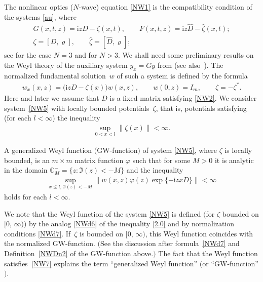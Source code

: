 \documentclass[pdftex]{sigma}
\def\vr{\varrho}
\def\vp{\varphi}
\def\wh{\widehat}
\def\BC{{\mathbb C}}
\newcommand{\I}{\mathrm{i}}
\numberwithin{equation}{section}
\begin{document}
The nonlinear optics ($N$-wave) equation \eqref{NW1} is the compatibility condition
of the systems \eqref{au}, where
\begin{gather} \label{NW4}
G(x,t,z)=\I z D-\zeta(x,t), \qquad F(x,t,z)=\I z \wh D-\wh \zeta(x,t); \nonumber\\ \zeta=[D, \vr], \qquad \wh \zeta =[\wh D, \vr];
\end{gather}
see \cite{ZaMa} for the case $N=3$ and \cite{AbH} for $N>3$. We shall need
some preliminary results on the Weyl theory of the auxiliary system $y_x=Gy$
from \cite[Chapter~4]{SaSaR} (see also~\cite{SaA17}). The normalized fundamental solution~$w$
of such a system is def\/ined by the formula
\begin{gather} \label{NW5}
w_x(x,z)=\big(\I z D-\zeta(x)\big)w(x,z), \qquad w(0,z)=I_m, \qquad \zeta =- \zeta^* .
\end{gather}
Here and later we assume that $D$ is a f\/ixed matrix satisfying \eqref{NW2}. We consider
system~\eqref{NW5} with locally bounded potentials~$\zeta$, that is, potentials satisfying (for each $l<\infty$)
the inequality
\begin{gather}
  \sup\limits_{0 < x < l}
   \bigl\|
    \zeta (x)
   \bigr\|
  < \infty.
 \label{NW6}
\end{gather}
\begin{Definition} \label{NWDn2}
 A generalized Weyl function $($GW-function$)$ of system
\eqref{NW5}, where $\zeta$ is locally bounded, is an $m \times m$ matrix function $\vp$ such that for some $M>0$ it is analytic in the domain
$\BC^{-}_M = \{ z \colon \Im(z) < - M \}$ and the
inequality
\begin{gather}
  \sup\limits_{x \leq l, \, \Im (z) < -M}
   \bigl\|
    w(x,z)
    \varphi (z)\exp \{-\I z x D\}
   \bigr\|
 < \infty
 \label{NW7}
\end{gather}
holds for each
$l < \infty$.
\end{Definition}

\begin{Remark} We note that the Weyl function of the system \eqref{NW5} is def\/ined $\big($for $\zeta$ bounded on $[0,\, \infty)\big)$
by the analog \eqref{NWd6} of the inequality \eqref{2.0} and by normalization conditions \eqref{NWd7}. If~$\zeta$ is bounded on $[0,\, \infty)$, this Weyl function
coincides with the normalized {\rm GW}-function.
$($See the discussion after formula~\eqref{NWd7} and Def\/inition~\ref{NWDn2} of the {\rm GW}-function above.$)$ The fact that the Weyl function satisf\/ies~\eqref{NW7} explains the term ``generalized Weyl function'' $($or ``{\rm GW}-function''$)$.
\end{Remark}
\end{document}
